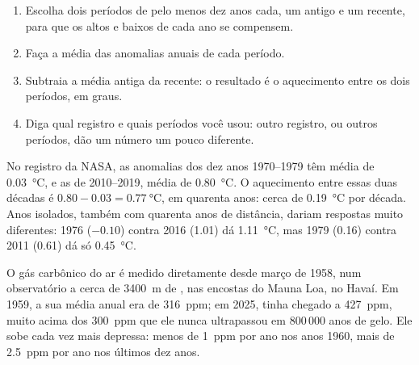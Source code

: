 \begin{method}
\begin{enumerate}
  \item Escolha dois períodos de pelo menos dez anos cada, um antigo e um
        recente, para que os altos e baixos de cada ano se compensem.
  \item Faça a média das anomalias anuais de cada período.
  \item Subtraia a média antiga da recente: o resultado é o aquecimento
        entre os dois períodos, em graus.
  \item Diga qual registro e quais períodos você usou: outro registro, ou
        outros períodos, dão um número um pouco diferente.
\end{enumerate}
\end{method}

\begin{example}
No registro da NASA, as anomalias dos dez anos 1970--1979 têm média de
\qty{0.03}{\degreeCelsius}, e as de 2010--2019, média de
\qty{0.80}{\degreeCelsius}. O aquecimento entre essas duas décadas é
$0.80 - 0.03 = \qty{0.77}{\degreeCelsius}$, em quarenta anos: cerca de
\qty{0.19}{\degreeCelsius} por década. Anos isolados, também com quarenta
anos de distância, dariam respostas muito diferentes: 1976 ($-0.10$)
contra 2016 (1.01) dá \qty{1.11}{\degreeCelsius}, mas 1979 (0.16) contra
2011 (0.61) dá só \qty{0.45}{\degreeCelsius}.
\end{example}

O gás carbônico do ar é medido diretamente desde março de 1958, num
observatório a cerca de \qty{3400}{m} de , nas encostas do 
Mauna Loa, no Havaí. Em 1959, a sua média anual era de \qty{316}{ppm};
em 2025, tinha chegado a \qty{427}{ppm}, muito acima dos \qty{300}{ppm}
que ele nunca ultrapassou em 800\,000 anos de gelo. Ele sobe cada vez
mais depressa: menos de \qty{1}{ppm} por ano nos anos 1960, mais de
\qty{2.5}{ppm} por ano nos últimos dez anos.

